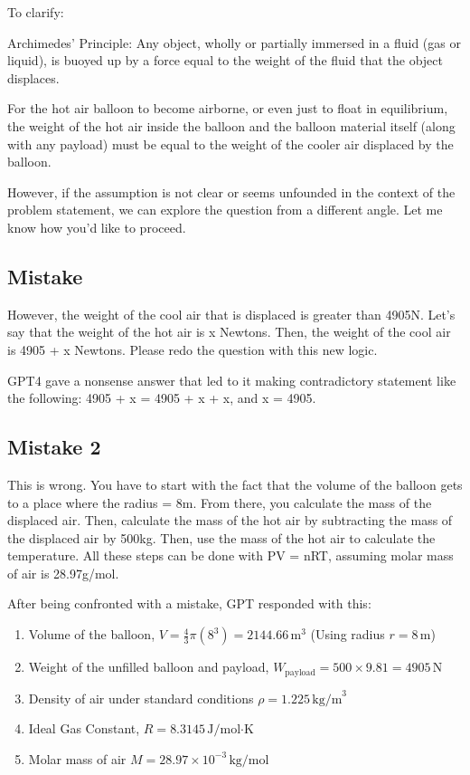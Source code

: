 \documentclass[12pt]{article}
\begin{document}
To clarify:


Archimedes' Principle: Any object, wholly or partially immersed in a fluid (gas or liquid), is buoyed up by a force equal to the weight of the fluid that the object displaces.

For the hot air balloon to become airborne, or even just to float in equilibrium, the weight of the hot air inside the balloon and the balloon material itself (along with any payload) must be equal to the weight of the cooler air displaced by the balloon.

However, if the assumption is not clear or seems unfounded in the context of the problem statement, we can explore the question from a different angle. Let me know how you'd like to proceed.

\subsection*{Mistake}

However, the weight of the cool air that is displaced is greater than 4905N. Let's say that the weight of the hot air is x Newtons. Then, the weight of the cool air is 4905 + x Newtons. Please redo the question with this new logic. 

GPT4 gave a nonsense answer that led to it making contradictory statement like the following: 4905 + x = 4905 + x + x, and x = 4905.

\subsection*{Mistake 2}

This is wrong. You have to start with the fact that the volume of the balloon gets to a place where the radius = 8m. From there, you calculate the mass of the displaced air. Then, calculate the mass of the hot air by subtracting the mass of the displaced air by 500kg. Then, use the mass of the hot air to calculate the temperature. All these steps can be done with PV = nRT, assuming molar mass of air is 28.97g/mol. 

After being confronted with a mistake, GPT responded with this:

\begin{enumerate}
    \item Volume of the balloon, \( V = \frac{4}{3} \pi (8^3) = 2144.66 \, \text{m}^3 \) (Using radius \( r = 8 \, \text{m} \))
    \item Weight of the unfilled balloon and payload, \( W_{\text{payload}} = 500 \times 9.81 = 4905 \, \text{N} \)
    \item Density of air under standard conditions \( \rho = 1.225 \, \text{kg/m}^3 \)
    \item Ideal Gas Constant, \( R = 8.3145 \, \text{J/mol·K} \)
    \item Molar mass of air \( M = 28.97 \times 10^{-3} \, \text{kg/mol} \)
\end{enumerate}
\end{document}

